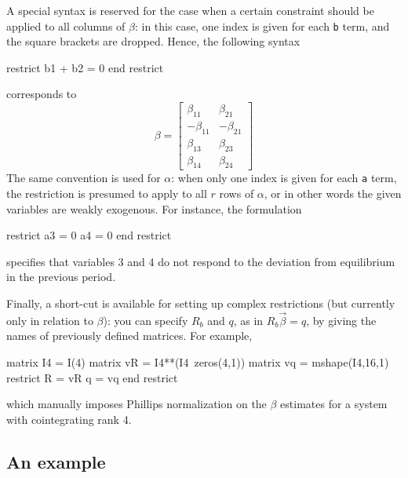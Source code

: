 A special syntax is reserved for the case when a certain constraint
should be applied to all columns of $\beta$: in this case, one index is
given for each \texttt{b} term, and the square brackets are dropped.
Hence, the following syntax
\begin{code}
restrict
  b1 + b2 = 0
end restrict
\end{code}
corresponds to
\[
\beta = \left[
\begin{array}{rr}
\beta_{11} & \beta_{21} \\
-\beta_{11} & -\beta_{21} \\
\beta_{13} & \beta_{23} \\
\beta_{14} & \beta_{24}
\end{array}
\right]
\]
The same convention is used for $\alpha$: when only one index is given for
each \texttt{a} term, the restriction is presumed to apply to all $r$
rows of $\alpha$, or in other words the given variables are weakly
exogenous. For instance, the formulation
%
\begin{code}
restrict
  a3 = 0
  a4 = 0
end restrict
\end{code}
%
specifies that variables 3 and 4 do not respond to the deviation from
equilibrium in the previous period.  

Finally, a short-cut is available for setting up complex restrictions (but
currently only in relation to $\beta$): you can specify $R_b$ and $q$,
as in $R_b \vec{\beta} = q$, by giving the names of previously
defined matrices.  For example,
%
\begin{code}
matrix I4 = I(4)
matrix vR = I4**(I4~zeros(4,1))
matrix vq = mshape(I4,16,1)
restrict
  R = vR
  q = vq
end restrict
\end{code}
%
which manually imposes Phillips normalization on the $\beta$ estimates
for a system with cointegrating rank 4.
 
\subsection{An example}
\label{sec:vecm-overid-ex}

